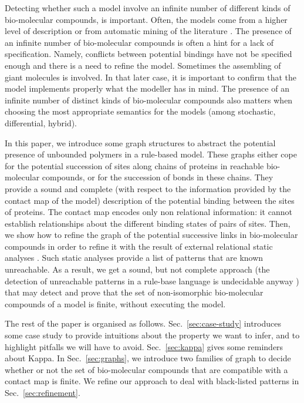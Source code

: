 \documentclass{entcs}
\begin{document}
Detecting whether such a model involve an infinite number of different kinds of bio-molecular compounds, is important. Often, the models come from a higher level of description \cite{DBLP:conf/cmsb/HarmerCLO17} or from automatic mining of the literature \cite{Gyori119834}. The presence of an infinite number of bio-molecular compounds is often a hint for a lack of specification. Namely, conflicts between potential bindings have not be specified enough and there is a need to refine the model. Sometimes the assembling of giant molecules is involved. In that later case, it is important to confirm that the model implements properly what the modeller has in mind.
The presence of an infinite number of distinct kinds of bio-molecular compounds also matters when choosing the most appropriate semantics for the models  (among stochastic, differential, hybrid).

In this paper, we introduce some graph structures to abstract the potential presence of unbounded polymers in a rule-based model. These graphs either cope for the potential succession of sites along chains of proteins in reachable bio-molecular compounds, or for the succession of bonds in these chains. They provide a sound and complete (with respect to the information provided by the contact map of the model) description of the potential binding between the sites of proteins.
The contact map encodes only non relational information: it cannot establish relationships about the different binding states of pairs of sites. Then, we show how to refine the graph of the potential successive links in bio-molecular compounds in order to refine it with the result of external relational static analyses \cite{DanosEtAl-VMCAI08,SASB2016,KaSa}. Such static analyses provide a list of patterns that are known unreachable. As a result, we get a sound, but not complete approach (the detection of unreachable patterns in a rule-base language is undecidable anyway \cite{kreyBig}) that may detect and prove that the set of non-isomorphic bio-molecular compounds of a model is finite, without executing the model.

The rest of the paper is organised as follows.
Sec.~\ref{sec:case-study} introduces some case study to provide intuitions about the property we want to infer, and to highlight pitfalls we will have to avoid. Sec.~\ref{sec:kappa} gives some reminders about Kappa.
In Sec.~\ref{sec:graphs}, we introduce two families of graph to decide whether or not the set of bio-molecular compounds that are compatible with a contact map is finite. We refine our approach to deal with black-listed patterns in Sec.~\ref{sec:refinement}.
\end{document}
